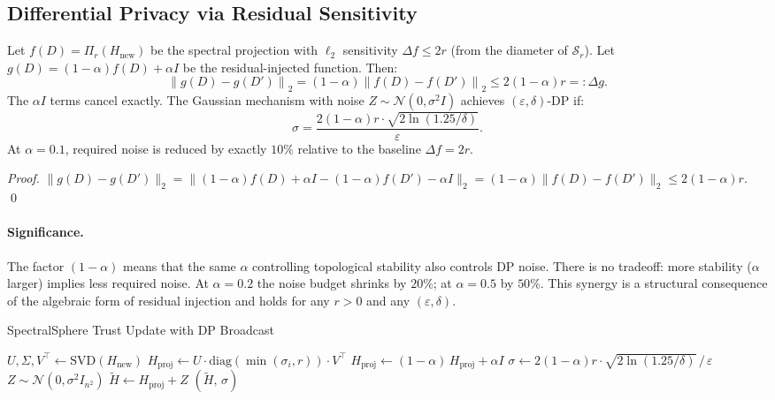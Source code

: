 \subsection{Differential Privacy via Residual Sensitivity}

\begin{lemma}
  \label{lem:residual_sensitivity}
  Let $f(D) = \Pi_r(H_{\mathrm{new}})$ be the spectral projection with $\ell_2$
  sensitivity $\Delta f \leq 2r$ (from the diameter of $\mathcal{S}_r$).  Let
  $g(D) = (1-\alpha)f(D) + \alpha I$ be the residual-injected function.  Then:
  \[
    \left\|g(D) - g(D')\right\|_2
      = (1-\alpha)\left\|f(D) - f(D')\right\|_2
      \leq 2(1-\alpha)r =: \Delta g.
  \]
  The $\alpha I$ terms cancel exactly.  The Gaussian mechanism with noise $Z \sim
  \mathcal{N}(0, \sigma^2 I)$ achieves $(\varepsilon, \delta)$-DP if:
  \[
    \sigma = \frac{2(1-\alpha)r \cdot \sqrt{2 \ln(1.25/\delta)}}{\varepsilon}.
  \]
  At $\alpha = 0.1$, required noise is reduced by exactly $10\%$ relative to the
  baseline $\Delta f = 2r$.
\end{lemma}

\begin{proof}
  $\|g(D) - g(D')\|_2 = \|(1-\alpha)f(D) + \alpha I - (1-\alpha)f(D') - \alpha I\|_2
  = (1-\alpha)\|f(D) - f(D')\|_2 \leq 2(1-\alpha)r$. \qed
\end{proof}

\paragraph{Significance.}
The factor $(1-\alpha)$ means that the same $\alpha$ controlling topological stability
also controls DP noise.  There is no tradeoff: more stability ($\alpha$ larger) implies
less required noise.  At $\alpha = 0.2$ the noise budget shrinks by $20\%$; at $\alpha =
0.5$ by $50\%$.  This synergy is a structural consequence of the algebraic form of
residual injection and holds for any $r > 0$ and any $(\varepsilon, \delta)$.

\begin{algorithm}[t]
  \caption{SpectralSphere Trust Update with DP Broadcast}
  \label{alg:spectral_dp}
  \SetAlgoLined
  \BlankLine
  $U, \Sigma, V^\top \leftarrow \mathrm{SVD}(H_{\mathrm{new}})$\;
  $H_{\mathrm{proj}} \leftarrow U \cdot \mathrm{diag}(\min(\sigma_i, r)) \cdot V^\top$\;
  \BlankLine
  $H_{\mathrm{proj}} \leftarrow (1-\alpha)\,H_{\mathrm{proj}} + \alpha I$\;
  \BlankLine
  $\sigma \leftarrow 2(1-\alpha)r \cdot \sqrt{2 \ln(1.25/\delta)} \,/\, \varepsilon$\;
  $Z \sim \mathcal{N}(0, \sigma^2 I_{n^2})$\;
  \BlankLine
  $\tilde{H} \leftarrow H_{\mathrm{proj}} + Z$\;
  \Return $(\tilde{H},\, \sigma)$\;
\end{algorithm}
